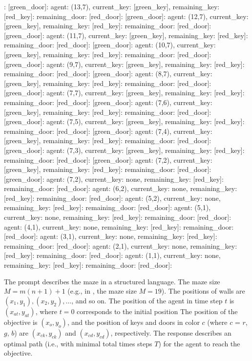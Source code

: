 \begin{tcolorbox}: [green\_door]:  agent: (13,7), current\_key: [green\_key], remaining\_key: [red\_key]: remaining\_door: [red\_door]: [green\_door]:  agent: (12,7), current\_key: [green\_key], remaining\_key: [red\_key]: remaining\_door: [red\_door]: [green\_door]:  agent: (11,7), current\_key: [green\_key], remaining\_key: [red\_key]: remaining\_door: [red\_door]: [green\_door]:  agent: (10,7), current\_key: [green\_key], remaining\_key: [red\_key]: remaining\_door: [red\_door]: [green\_door]:  agent: (9,7), current\_key: [green\_key], remaining\_key: [red\_key]: remaining\_door: [red\_door]: [green\_door]:  agent: (8,7), current\_key: [green\_key], remaining\_key: [red\_key]: remaining\_door: [red\_door]: [green\_door]:  agent: (7,7), current\_key: [green\_key], remaining\_key: [red\_key]: remaining\_door: [red\_door]: [green\_door]:  agent: (7,6), current\_key: [green\_key], remaining\_key: [red\_key]: remaining\_door: [red\_door]: [green\_door]:  agent: (7,5), current\_key: [green\_key], remaining\_key: [red\_key]: remaining\_door: [red\_door]: [green\_door]:  agent: (7,4), current\_key: [green\_key], remaining\_key: [red\_key]: remaining\_door: [red\_door]: [green\_door]:  agent: (7,3), current\_key: [green\_key], remaining\_key: [red\_key]: remaining\_door: [red\_door]: [green\_door]:  agent: (7,2), current\_key: [green\_key], remaining\_key: [red\_key]: remaining\_door: [red\_door]: [green\_door]:  agent: (7,2), current\_key: none, remaining\_key: [red\_key]: remaining\_door: [red\_door]:  agent: (6,2), current\_key: none, remaining\_key: [red\_key]: remaining\_door: [red\_door]:  agent: (5,2), current\_key: none, remaining\_key: [red\_key]: remaining\_door: [red\_door]:  agent: (5,1), current\_key: none, remaining\_key: [red\_key]: remaining\_door: [red\_door]:  agent: (4,1), current\_key: none, remaining\_key: [red\_key]: remaining\_door: [red\_door]:  agent: (3,1), current\_key: none, remaining\_key: [red\_key]: remaining\_door: [red\_door]:  agent: (2,1), current\_key: none, remaining\_key: [red\_key]: remaining\_door: [red\_door]:  agent: (1,1), current\_key: none, remaining\_key: [red\_key]: remaining\_door: [red\_door]:  
\end{tcolorbox}




The prompt describes the maze in a structured language. The maze size $M = m(n+1)+1$ (e.g., in , the maze size $M = 19$). The positions of walls are $(x_1, y_1), (x_2, y_2), \ldots$, and so on. The position of the agent in time step $t$ is $(x_{at}, y_{at})$, where $t = 0$ corresponds to the initial position The position of the objective is $(x_o, y_o)$, and the position of keys and doors in color $c$ (where $c$ = $r$, $g$, $b$) are $(x_{ck}, y_{ck})$ and $(x_{cd}, y_{cd})$, respectively. The response describes an optimal path (i.e., with minimal total times steps $T$) for the agent to reach the objective.

